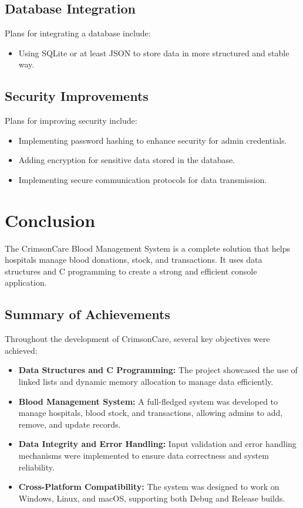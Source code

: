 \documentclass[12pt,a4paper]{report}
\begin{document}
\section{Database Integration}
Plans for integrating a database include:
\begin{itemize}
    \item Using SQLite or at least JSON to store data in more structured and stable way.
\end{itemize}

\section{Security Improvements}
Plans for improving security include:
\begin{itemize}
    \item Implementing password hashing to enhance security for admin credentials.
    \item Adding encryption for sensitive data stored in the database.
    \item Implementing secure communication protocols for data transmission.
\end{itemize}

\chapter{Conclusion}
The CrimsonCare Blood Management System is a complete solution that helps hospitals
manage blood donations, stock, and transactions. It uses data structures and
C programming to create a strong and efficient console application.

\section{Summary of Achievements}
Throughout the development of CrimsonCare, several key objectives were achieved:
\begin{itemize}
    \item \textbf{Data Structures and C Programming:} The project showcased the use of linked lists and dynamic memory allocation to manage data efficiently.
    \item \textbf{Blood Management System:} A full-fledged system was developed to manage hospitals, blood stock, and transactions, allowing admins to add, remove, and update records.
    \item \textbf{Data Integrity and Error Handling:} Input validation and error handling mechanisms were implemented to ensure data correctness and system reliability.
    \item \textbf{Cross-Platform Compatibility:} The system was designed to work on Windows, Linux, and macOS, supporting both Debug and Release builds.
\end{itemize}
\end{document}
